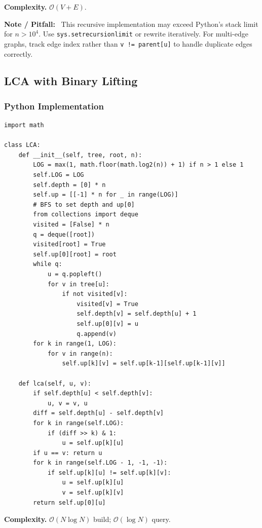 \documentclass[10pt,a4paper]{article}
\theoremstyle{cpstyle}
\newenvironment{cpnote}{%
  \begin{mdframed}[backgroundcolor=notebg, linecolor=orange!70, linewidth=1pt,
    innerleftmargin=10pt, innerrightmargin=10pt, innertopmargin=6pt, innerbottommargin=6pt]
  \textbf{\color{orange!80!black}Note / Pitfall:}~}{%
  \end{mdframed}}
\newcommand{\bigO}[1]{\mathcal{O}\!\left(#1\right)}
\begin{document}
\textbf{Complexity.} $\bigO{V+E}$.

\begin{cpnote}
This recursive implementation may exceed Python's stack limit for $n > 10^4$. Use \texttt{sys.setrecursionlimit} or rewrite iteratively. For multi-edge graphs, track edge index rather than \texttt{v != parent[u]} to handle duplicate edges correctly.
\end{cpnote}

\subsection{LCA with Binary Lifting}

\subsubsection{Python Implementation}
\begin{lstlisting}[caption={LCA using Binary Lifting}]
import math

class LCA:
    def __init__(self, tree, root, n):
        LOG = max(1, math.floor(math.log2(n)) + 1) if n > 1 else 1
        self.LOG = LOG
        self.depth = [0] * n
        self.up = [[-1] * n for _ in range(LOG)]
        # BFS to set depth and up[0]
        from collections import deque
        visited = [False] * n
        q = deque([root])
        visited[root] = True
        self.up[0][root] = root
        while q:
            u = q.popleft()
            for v in tree[u]:
                if not visited[v]:
                    visited[v] = True
                    self.depth[v] = self.depth[u] + 1
                    self.up[0][v] = u
                    q.append(v)
        for k in range(1, LOG):
            for v in range(n):
                self.up[k][v] = self.up[k-1][self.up[k-1][v]]

    def lca(self, u, v):
        if self.depth[u] < self.depth[v]:
            u, v = v, u
        diff = self.depth[u] - self.depth[v]
        for k in range(self.LOG):
            if (diff >> k) & 1:
                u = self.up[k][u]
        if u == v: return u
        for k in range(self.LOG - 1, -1, -1):
            if self.up[k][u] != self.up[k][v]:
                u = self.up[k][u]
                v = self.up[k][v]
        return self.up[0][u]
\end{lstlisting}

\textbf{Complexity.} $\bigO{N \log N}$ build; $\bigO{\log N}$ query.
\end{document}
